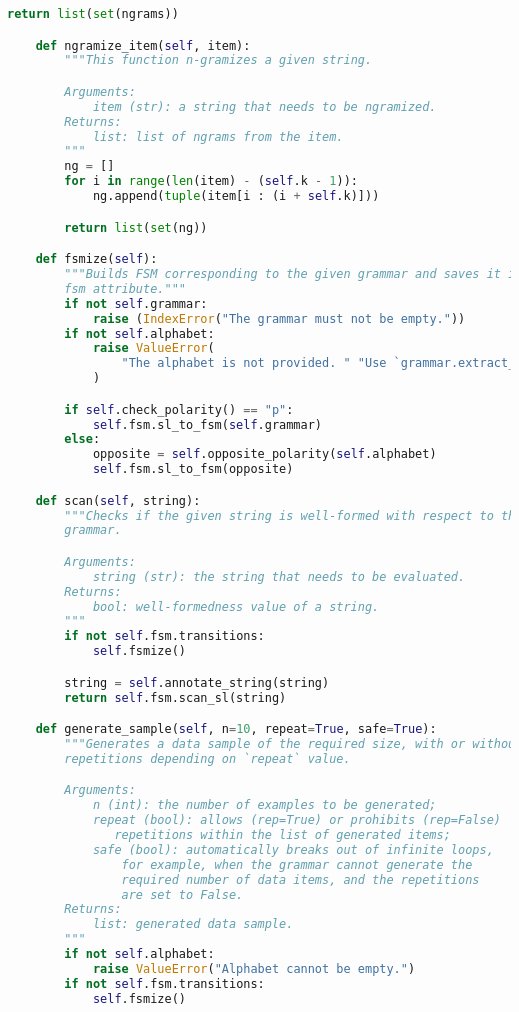 \begin{lstlisting}[language=Python]
        return list(set(ngrams))

    def ngramize_item(self, item):
        """This function n-gramizes a given string.

        Arguments:
            item (str): a string that needs to be ngramized.
        Returns:
            list: list of ngrams from the item.
        """
        ng = []
        for i in range(len(item) - (self.k - 1)):
            ng.append(tuple(item[i : (i + self.k)]))

        return list(set(ng))

    def fsmize(self):
        """Builds FSM corresponding to the given grammar and saves it in the
        fsm attribute."""
        if not self.grammar:
            raise (IndexError("The grammar must not be empty."))
        if not self.alphabet:
            raise ValueError(
                "The alphabet is not provided. " "Use `grammar.extract_alphabet()`."
            )

        if self.check_polarity() == "p":
            self.fsm.sl_to_fsm(self.grammar)
        else:
            opposite = self.opposite_polarity(self.alphabet)
            self.fsm.sl_to_fsm(opposite)

    def scan(self, string):
        """Checks if the given string is well-formed with respect to the given
        grammar.

        Arguments:
            string (str): the string that needs to be evaluated.
        Returns:
            bool: well-formedness value of a string.
        """
        if not self.fsm.transitions:
            self.fsmize()

        string = self.annotate_string(string)
        return self.fsm.scan_sl(string)

    def generate_sample(self, n=10, repeat=True, safe=True):
        """Generates a data sample of the required size, with or without
        repetitions depending on `repeat` value.

        Arguments:
            n (int): the number of examples to be generated;
            repeat (bool): allows (rep=True) or prohibits (rep=False)
               repetitions within the list of generated items;
            safe (bool): automatically breaks out of infinite loops,
                for example, when the grammar cannot generate the
                required number of data items, and the repetitions
                are set to False.
        Returns:
            list: generated data sample.
        """
        if not self.alphabet:
            raise ValueError("Alphabet cannot be empty.")
        if not self.fsm.transitions:
            self.fsmize()


\end{lstlisting}

